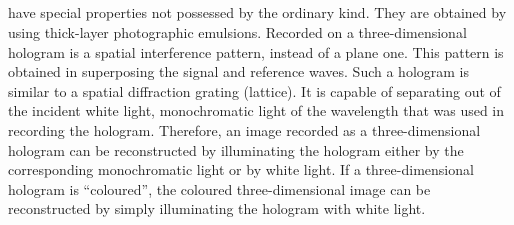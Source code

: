 \subsection{}\label{33.6.5}  have special properties not possessed by the ordinary kind. They are obtained by using thick-layer photographic emulsions. Recorded on a three-dimensional hologram is a spatial interference pattern, instead
of a plane one. This pattern is obtained in superposing the signal and reference waves. Such a hologram is similar to a spatial diffraction grating (lattice). It is capable of separating out of the incident white light, monochromatic light of the wavelength that was used in recording the hologram. Therefore, an image recorded as a three-dimensional hologram can be reconstructed by illuminating the hologram either by the corresponding monochromatic light or by white light. If a three-dimensional hologram is ``coloured'', the coloured three-dimensional image can be reconstructed by simply illuminating the hologram with white light.
